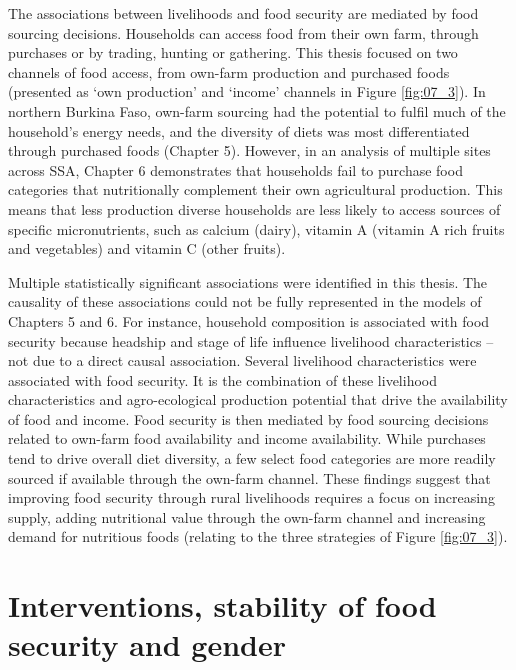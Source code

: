 The associations between livelihoods and food security are mediated by food sourcing decisions. Households can access food from their own farm, through purchases or by trading, hunting or gathering. This thesis focused on two channels of food access, from own-farm production and purchased foods (presented as `own production' and `income' channels in Figure \ref{fig:07_3}). In northern Burkina Faso, own-farm sourcing had the potential to fulfil much of the household's energy needs, and the diversity of diets was most differentiated through purchased foods (Chapter 5). However, in an analysis of multiple sites across SSA, Chapter 6 demonstrates that households fail to purchase food categories that nutritionally complement their own agricultural production. This means that less production diverse households are less likely to access sources of specific micronutrients, such as calcium (dairy), vitamin A (vitamin A rich fruits and vegetables) and vitamin C (other fruits).

Multiple statistically significant associations were identified in this thesis. The causality of these associations could not be fully represented in the models of Chapters 5 and 6. For instance, household composition is associated with food security because headship and stage of life influence livelihood characteristics -- not due to a direct causal association. Several livelihood characteristics were associated with food security. It is the combination of these livelihood characteristics and agro-ecological production potential that drive the availability of food and income. Food security is then mediated by food sourcing decisions related to own-farm food availability and income availability. While purchases tend to drive overall diet diversity, a few select food categories are more readily sourced if available through the own-farm channel. These findings suggest that improving food security through rural livelihoods requires a focus on increasing supply, adding nutritional value through the own-farm channel and increasing demand for nutritious foods (relating to the three strategies of Figure \ref{fig:07_3}).

\section{Interventions, stability of food security and gender}
